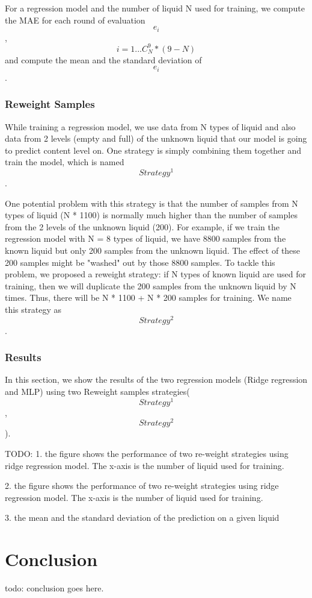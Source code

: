 \documentclass{article} %
\begin{document}
For a regression model and the number of liquid N used for training, we compute the MAE for each round of evaluation\[e_i\], \[ i= 1...C^9_N * (9-N)\] and compute the mean and the standard deviation of \[e_i\].

\subsubsection{Reweight Samples}
While training a regression model, we use data from N types of liquid and also data from 2 levels (empty and full) of the unknown liquid that our model is going to predict content level on. One strategy is simply combining them together and train the model, which is named \[Strategy^1\]. 

One potential problem with this strategy is that the number of samples from N types of liquid (N * 1100) is normally much higher than the number of samples from the 2 levels of the unknown liquid (200). For example, if we train the regression model with N = 8 types of liquid, we have 8800 samples from the known liquid but only 200 samples from the unknown liquid. The effect of these 200 samples might be "washed" out by those 8800 samples. To tackle this problem, we proposed a reweight strategy: if N types of known liquid are used for training, then we will duplicate the 200 samples from the unknown liquid by N times. Thus, there will be N * 1100 + N * 200 samples for training. We name this strategy as \[Strategy^2\].

\subsubsection{Results}
In this section, we show the results of the two regression models (Ridge regression and MLP) using two Reweight samples strategies(\[Strategy^1\],\[Strategy^2\]).

TODO: 
1. the figure shows the performance of two re-weight strategies using ridge regression model. The x-axis is the number of liquid used for training.

2. the figure shows the performance of two re-weight strategies using ridge regression model. The x-axis is the number of liquid used for training.

3. the mean and the standard deviation of the prediction on a given liquid 

\section{Conclusion}
todo: conclusion goes here.
\end{document}
